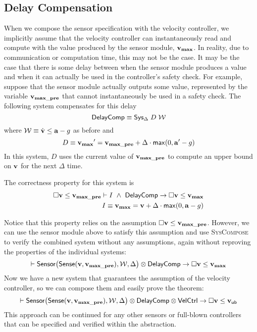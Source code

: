 \subsection{Delay Compensation}
\label{sec:delay-comp}
When we compose the sensor specification with the velocity controller, we
implicitly assume that the velocity controller can instantaneously read and
compute with the value produced by the sensor module, $\mathbf{v_{max}}$.  In reality,
due to communication or computation time, this may not be the case.  It may
be the case that there is some delay between when the sensor module
produces a value and when it can actually be used in the controller's
safety check.  For example, suppose that the sensor module actually outputs
some value, represented by the variable $\mathbf{v_{max\_pre}}$ that cannot
instantaneously be used in a safety check.  The following system
compensates for this delay
\[
{\textsf{DelayComp}} \equiv {\textsf{Sys}}{}_{\Delta}\;D\;\mathcal{W}
\]
where $\mathcal{W} \equiv \dot{\mathbf{v}}\leq\mathbf{a} - g$ as before and
\[
D  \equiv \mathbf{v_{max}}{}^\prime = \mathbf{v_{max\_pre}} + \Delta \cdot \mathsf{max}(0, \mathbf{a}{}^\prime - g)
\]
In this system, $D$ uses the current value of $\mathbf{v_{max\_pre}}$ to compute an
upper bound on $\mathbf{v}$ for the next $\Delta$ time.

The correctness property for this system is
\begin{align}
\Box{} \mathbf{v} \leq \mathbf{v_{max\_pre}} \vdash I~\wedge~{\textsf{DelayComp}} \rightarrow \Box{} \mathbf{v} \leq \mathbf{v_{max}} \\
I \equiv \mathbf{v_{max}} = \mathbf{v} + \Delta \cdot \mathsf{max}(0, \mathbf{a} - g) \nonumber
\label{thm:delay-safe}
\end{align}

Notice that this property relies on the assumption $\Box{} \mathbf{v} \leq
  \mathbf{v_{max\_pre}}$.  However, we can use the sensor module above to satisfy this
assumption and use \textsc{SysCompose} to verify the combined system
without any assumptions, again without reproving the properties of the
individual systems:
\[
\vdash {\textsf{Sensor}}\big({\textsf{Sense}}(\mathbf{v},\mathbf{v_{max\_pre}}),\mathcal{W}, \Delta\big) \otimes {\textsf{DelayComp}} \rightarrow \Box{} \mathbf{v} \leq \mathbf{v_{max}}
\]
Now we have a new system that guarantees the assumption of the velocity
controller, so we can compose them and easily prove the theorem:
\[
\vdash {\textsf{Sensor}}\big({\textsf{Sense}}(\mathbf{v},\mathbf{v_{max\_pre}}),\mathcal{W}, \Delta\big) \otimes {\textsf{DelayComp}} \otimes {\textsf{VelCtrl}} \rightarrow \Box{} \mathbf{v} \leq \mathsf{\mathbf{v}_{ub}}
\]
This approach can be continued for any other sensors or full-blown
controllers that can be specified and verified within the \SysA{}
abstraction.

